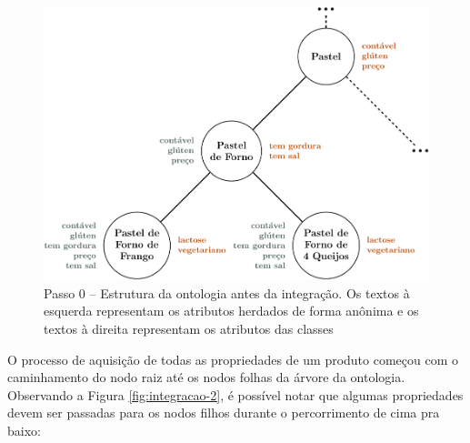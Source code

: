 \begin{figure}[H]
		\centering
		\caption[Integração da Ontologia -- Passo 0]{Passo 0 -- Estrutura da ontologia antes da integração. Os textos à esquerda representam os atributos herdados de forma anônima e os textos à direita representam os atributos das classes}
		\label{fig:integracao-1}
		\includegraphics[width=0.6\linewidth]{./pdf/tikz/toptop-1.pdf}
\end{figure}

O processo de aquisição de todas as propriedades de um produto começou com o caminhamento do nodo raiz até os nodos folhas da árvore da ontologia. Observando a Figura \ref{fig:integracao-2}, é possível notar que algumas propriedades devem ser passadas para os nodos filhos durante o percorrimento de cima pra baixo:

